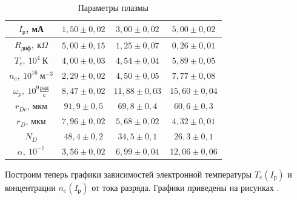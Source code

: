 \documentclass[a4paper,10pt]{article}
\begin{document}
\begin{table}[h]
	\centering
	\caption{Параметры плазмы} \label{Electrons}
	\begin{tabular}{|c|c|c|c|}
		\hline
		$I_{\text{р}}$, мА & $1,50\pm0,02$ & $3,00\pm0,02$ & $5,00\pm0,02$ \\ \hline
		$R_{\text{диф}},\ \text{к}\Omega$ & $5,00\pm0,15$ & $1,25\pm0,07$ & $0,26\pm0,01$ \\ \hline
		$T_e,\ 10^4~\text{К}$ & $4,00\pm0,03$ & $4,54\pm0,04$ & $5,89\pm0,05$ \\ \hline
		$n_e,\ 10^{16}~\text{м}^{-3}$ & $2,29\pm0,02$ & $4,50\pm0,05$ & $7,77\pm0,08$ \\ \hline
		$\omega_p,\ 10^9\frac{\text{рад}}{\text{с}}$ & $8,47\pm0,02$ & $11,88\pm0,03$ & $15,60\pm0,04$ \\ \hline
		$r_{De}$, мкм & $91,9\pm0,5$ & $69,8\pm0,4$ & $60,6\pm0,3$ \\ \hline
		$r_{D}$, мкм & $7,96\pm0,02$ & $5,68\pm0,02$ & $4,32\pm0,01$ \\ \hline
		$N_D$ & $48,4\pm0,2$ & $34,5\pm0,1$ & $26,3\pm0,1$ \\ \hline
		$\alpha,\ 10^{-7}$ & $3,56\pm0,02$ & $6,99\pm0,04$ & $12,06\pm0,06$ \\ \hline
	\end{tabular}
\end{table}

Построим теперь графики зависимостей электронной температуры $T_e(I_{\text{р}})$ и концентрации $n_e(I_{\text{р}})$ от тока разряда. Графики приведены на рисунках  .
\end{document}
